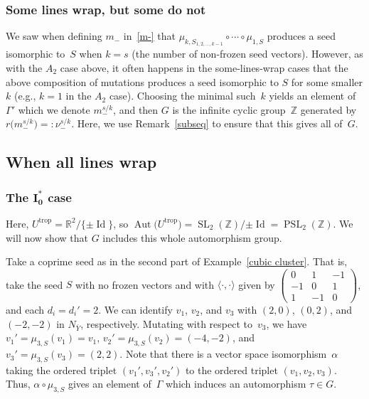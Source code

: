 \documentclass[pdftex]{sigma}
\numberwithin{equation}{section}
\numberwithin{figure}{section}
\numberwithin{table}{section}
\DeclareMathOperator{\id}{Id}
\DeclareMathOperator{\Id}{Id}
\DeclareMathOperator{\SL}{SL}
\DeclareMathOperator{\PSL}{PSL}
\DeclareMathOperator{\trop}{trop}
\DeclareMathOperator{\Aut}{Aut}
\let\?=\overline
\let\bb=\mathbb
\theoremstyle{definition}
\begin{document}
\subsubsection{Some lines wrap, but some do not} We saw when defining $m_-$ in~\eqref{m-} that $\mu_{k,S_{1,2,\dots,k-1}}\circ \cdots \circ \mu_{1,S}$ produces a seed isomorphic to~$S$ when $k=s$ (the number of non-frozen seed vectors). However, as with the $A_2$ case above, it often happens in the some-lines-wrap cases that the above composition of mutations produces a seed isomorphic to $S$ for some smaller $k$ (e.g., $k=1$ in the $A_2$ case). Choosing the minimal such~$k$ yields an element of $\Gamma'$ which we denote $m_-^{s/k}$, and then $G$ is the infinite cyclic group~$\bb{Z}$ generated by $r\big(m_-^{s/k}\big)=:\nu_-^{s/k}$. Here, we use Remark~\ref{subseq} to ensure that this gives all of~$G$.

\subsection{When all lines wrap}\label{Auto-wrap}

\subsubsection[The $I_0^*$ case]{The $\boldsymbol{I_0^*}$ case}\label{I0star} Here, $U^{\trop}=\bb{R}^2/\{\pm \Id\}$, so $\Aut\big(U^{\trop}\big)=\SL_2(\bb{Z})/{\pm \id} = \PSL_2(\bb{Z})$. We will now show that $G$ includes this whole automorphism group.

Take a coprime seed as in the second part of Example~\ref{cubic cluster}. That is, take the seed $S$ with no frozen vectors and with $\langle \cdot,\cdot\rangle$ given by
	$\left(\begin{smallmatrix}
		0 &1 &-1 \\
	 -1 &0 &1 \\
	 1 &-1 &0
		\end{smallmatrix}\right)$,
		and each $d_i=d_i'=2$. We can identify $v_1$, $v_2$, and $v_3$ with $(2,0)$, $(0,2)$, and $(-2,-2)$ in $N_{\?{Y}}$, respectively. Mutating with respect to~$v_3$, we have $v_1'=\mu_{3,S}(v_1)=v_1$, $v_2'=\mu_{3,S}(v_2)=(-4,-2)$, and $v_3'=\mu_{3,S}(v_3)=(2,2)$. Note that there is a vector space isomorphism~$\alpha$ taking the ordered triplet $(v_1',v_3',v_2')$ to the ordered triplet $(v_1,v_2,v_3)$. Thus, $\alpha \circ \mu_{3,S}$ gives an element of~$\Gamma$ which induces an automorphism $\tau \in G$.
		
\end{document}
